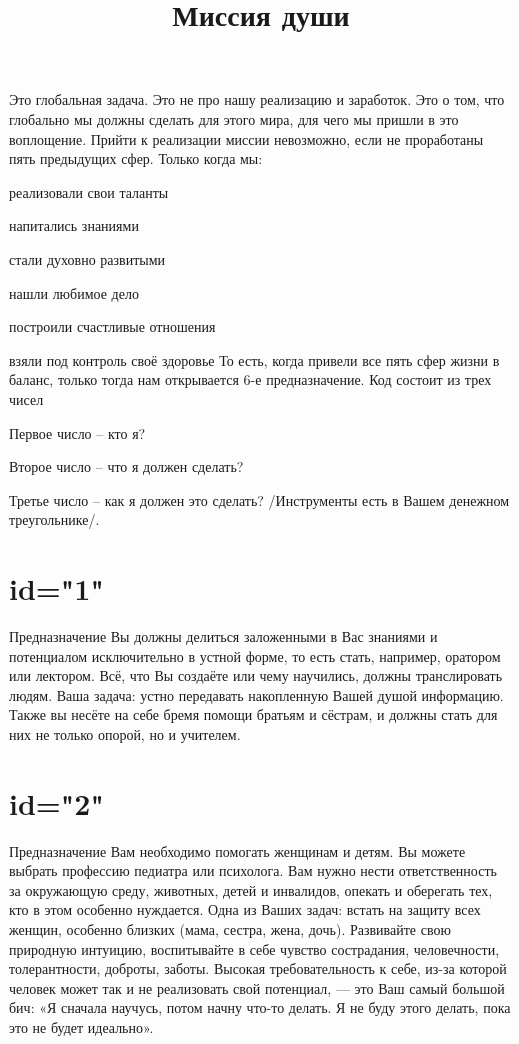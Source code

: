 \title{Миссия души}
\description
Это глобальная задача. Это не про нашу реализацию и заработок. 
Это о том, что глобально мы должны сделать для этого мира, 
для чего мы пришли в это воплощение.
Прийти к реализации миссии невозможно, если не проработаны 
пять предыдущих сфер.
Только когда мы: 
\item реализовали свои таланты
\item напитались знаниями
\item стали духовно развитыми
\item нашли любимое дело
\item построили счастливые отношения
\item взяли под контроль своё здоровье
То есть, когда привели все пять сфер жизни в баланс, 
только тогда нам открывается 6-е предназначение.
Код состоит из трех чисел
\item Первое число – кто я?
\item Второе число – что я должен сделать?
\item Третье число – как я должен это сделать? 
/Инструменты есть в Вашем денежном треугольнике/.
\enddescription

\section{id="1"}{Предназначение}
Вы должны делиться заложенными в Вас знаниями и потенциалом 
исключительно в устной форме, то есть стать, например, 
оратором или лектором. Всё, что Вы создаёте или чему научились, 
должны транслировать людям.
Ваша задача: устно передавать накопленную Вашей душой информацию. 
Также вы несёте на себе бремя помощи братьям и сёстрам, 
и должны стать для них не только опорой, но и учителем.
\endsection

\section{id="2"}{Предназначение}
Вам необходимо помогать женщинам и детям. Вы можете выбрать 
профессию педиатра или психолога. Вам нужно нести ответственность 
за окружающую среду, животных, детей и инвалидов, опекать и 
оберегать тех, кто в этом особенно нуждается.
Одна из Ваших задач: встать на защиту всех женщин, особенно 
близких (мама, сестра, жена, дочь).
Развивайте свою природную интуицию, воспитывайте в себе чувство 
сострадания, человечности, толерантности, доброты, заботы.
Высокая требовательность к себе, из-за которой человек может 
так и не реализовать свой потенциал, — это Ваш самый большой бич: 
«Я сначала научусь, потом начну что-то делать. Я не буду этого 
делать, пока это не будет идеально».
\endsection

